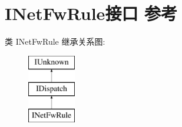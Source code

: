 \hypertarget{interface_i_net_fw_rule}{}\section{I\+Net\+Fw\+Rule接口 参考}
\label{interface_i_net_fw_rule}
类 I\+Net\+Fw\+Rule 继承关系图\+:\begin{figure}[H]
\begin{center}
\leavevmode
\includegraphics[height=3.000000cm]{interface_i_net_fw_rule}
\end{center}
\end{figure}
